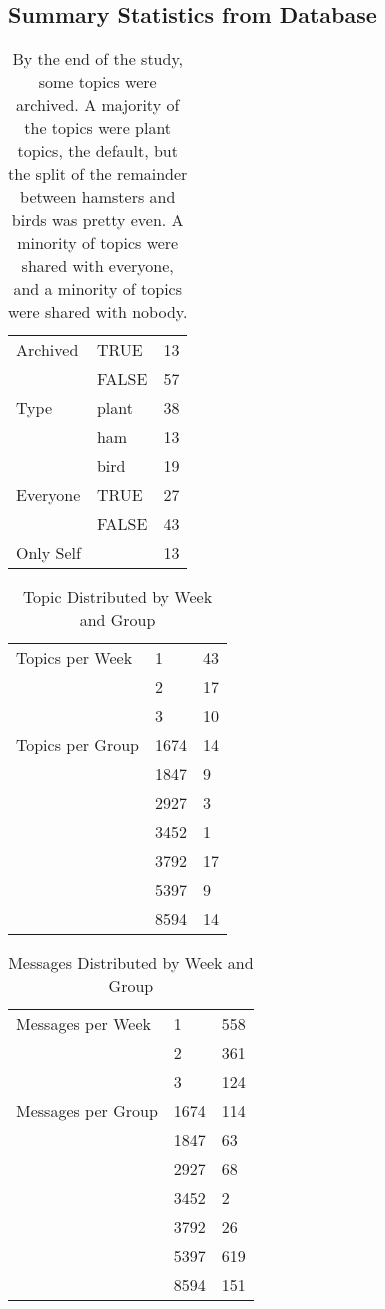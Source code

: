 \subsection{Summary Statistics from Database}
    \renewcommand{\arraystretch}{1.2}
    \begin{table}[H]
    \centering
    \begin{tabular}{ l  l  l }
    Archived & TRUE & 13 \\
     & FALSE & 57 \\
    \hline
    Type & plant & 38 \\
    & ham & 13 \\
    & bird & 19 \\
    \hline
    Everyone & TRUE & 27 \\
    & FALSE & 43 \\
    Only Self& & 13 \\
    \end{tabular}
    \caption[Topic Features]{
    By the end of the study, some topics were archived.
    A majority of the topics were plant topics, the default,
    but the split of the remainder between hamsters and birds was pretty even.
    A minority of topics were shared with everyone,
    and a minority of topics were shared with nobody.}
    \end{table}

    \renewcommand{\arraystretch}{1.2}
    \begin{table}[H]
    \centering
    \begin{tabular}{ l  l  l }
    Topics per Week & 1 & 43 \\
    &2 & 17 \\
    &3 & 10 \\
    \hline
    Topics per Group & 1674 &14 \\
    &1847 & 9\\
    &2927 & 3\\
    &3452 & 1\\
    &3792 & 17\\
    &5397&9\\
    &8594&14
    \end{tabular}
    \caption{Topic Distributed by Week and Group}
    \end{table}

    \renewcommand{\arraystretch}{1.2}
    \begin{table}[H]
    \centering
    \begin{tabular}{ l  l  l }
    Messages per Week & 1 & 558 \\
    &2 & 361\\
    &3 & 124\\
    \hline
    Messages per Group & 1674 &114 \\
    &1847 & 63\\
    &2927 & 68\\
    &3452 & 2\\
    &3792 & 26\\
    &5397&619\\
    &8594&151
    \end{tabular}
    \caption{Messages Distributed by Week and Group}
    \end{table}
\clearpage
\newpage
